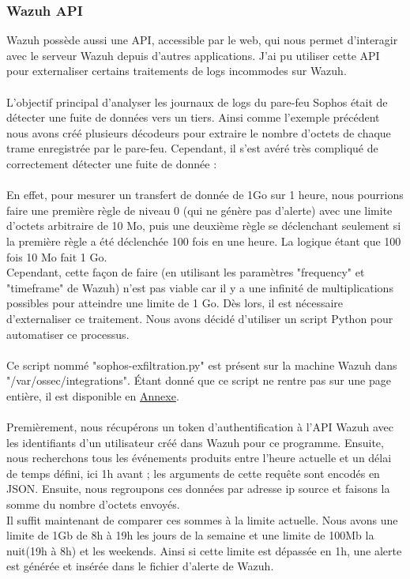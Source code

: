 \documentclass[a4paper, 11pt]{article}
\begin{document}
\subsubsection{Wazuh API}

Wazuh possède aussi une API, accessible par le web, qui nous permet d'interagir avec le serveur Wazuh depuis d'autres applications. J'ai pu utiliser cette API pour externaliser certains traitements de logs incommodes sur Wazuh.\\
\\
L'objectif principal d'analyser les journaux de logs du pare-feu Sophos était de détecter une fuite de données vers un tiers. Ainsi comme l'exemple précédent nous avons créé plusieurs décodeurs pour extraire le nombre d'octets de chaque trame enregistrée par le pare-feu. Cependant, il s'est avéré très compliqué de correctement détecter une fuite de donnée :\\
\\
En effet, pour mesurer un transfert de donnée de 1Go sur 1 heure, nous pourrions faire une première règle de niveau 0 (qui ne génère pas d'alerte) avec une limite d'octets arbitraire de 10 Mo, puis une deuxième règle se déclenchant seulement si la première règle a été déclenchée 100 fois en une heure. La logique étant que 100 fois 10 Mo fait 1 Go.\\
Cependant, cette façon de faire (en utilisant les paramètres "frequency" et "timeframe" de Wazuh) n'est pas viable car il y a une infinité de multiplications possibles pour atteindre une limite de 1 Go. Dès lors, il est nécessaire d'externaliser ce traitement. Nous avons décidé d'utiliser un script Python pour automatiser ce processus.\\
\\
Ce script nommé "sophos-exfiltration.py" est présent sur la machine Wazuh dans "/var/ossec/integrations". Étant donné que ce script ne rentre pas sur une page entière, il est disponible en \hyperref[fig:sophos-integration]{Annexe}.\\
\\
Premièrement, nous récupérons un token d'authentification à l'API Wazuh avec les identifiants d'un utilisateur créé dans Wazuh pour ce programme. Ensuite, nous recherchons tous les événements produits entre l'heure actuelle et un délai de temps défini, ici 1h avant ; les arguments de cette requête sont encodés en JSON. Ensuite, nous regroupons ces données par adresse ip source et faisons la somme du nombre d'octets envoyés.\\
Il suffit maintenant de comparer ces sommes à la limite actuelle. Nous avons une limite de 1Gb de 8h à 19h les jours de la semaine et une limite de 100Mb la nuit(19h à 8h) et les weekends. Ainsi si cette limite est dépassée en 1h, une alerte est générée et insérée dans le fichier d'alerte de Wazuh.\\
\end{document}
